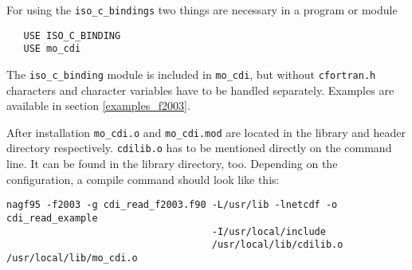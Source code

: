 For using the {\tt iso\_c\_bindings} two things are necessary in a program or module

\begin{verbatim}
   USE ISO_C_BINDING
   USE mo_cdi
\end{verbatim}

The {\tt iso\_c\_binding} module is included in {\tt mo\_cdi}, but without
{\tt cfortran.h} characters and character variables have to be handled separately.
Examples are available in section \ref{examples_f2003}.

After installation {\tt mo\_cdi.o} and {\tt mo\_cdi.mod} are located in the
library and header directory respectively. {\tt cdilib.o} has to be
mentioned directly on the command line. It can be found in the
library directory, too. Depending on the {\CDI} configuration, a compile command
should look like this:

\begin{verbatim}
nagf95 -f2003 -g cdi_read_f2003.f90 -L/usr/lib -lnetcdf -o cdi_read_example 
                                    -I/usr/local/include 
                                    /usr/local/lib/cdilib.o /usr/local/lib/mo_cdi.o
\end{verbatim}



